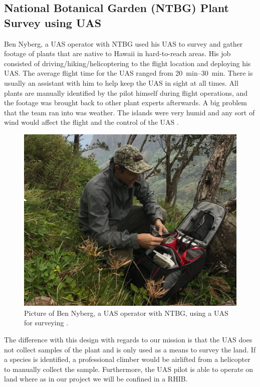 \documentclass{wrcecapstone}
\begin{document}
\subsection{National Botanical Garden (NTBG) Plant Survey using UAS}
Ben Nyberg, a UAS operator with NTBG used his UAS to survey and gather footage of plants that are native to Hawaii in hard-to-reach areas.  His job consisted of driving/hiking/helicoptering to the flight location and deploying his UAS.  The average flight time for the UAS ranged from \SIrange{20}{30}{\minute}.  There is usually an assistant with him to help keep the UAS in sight at all times.  All plants are manually identified by the pilot himself during flight operations, and the footage was brought back to other plant experts afterwards.  A big problem that the team ran into was weather.  The islands were very humid and any sort of wind would affect the flight and the control of the UAS \cite{mongabay2019hunting}. 
\begin{figure}
\begin{center}
\includegraphics[width=0.8\columnwidth]{figures/fig31-nyberg.png}
\end{center}
\caption{Picture of Ben Nyberg, a UAS operator with NTBG, using a UAS for surveying \cite{mongabay2019hunting}.}
\label{fig:3.1}
\end{figure}

The difference with this design with regards to our mission is that the UAS does not collect samples of the plant and is only used as a means to survey the land. If a species is identified, a professional climber would be airlifted from a helicopter to manually collect the sample. Furthermore, the UAS pilot is able to operate on land where as in our project we will be confined in a RHIB. 
\end{document}
